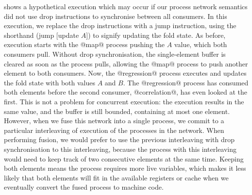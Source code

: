  shows a hypothetical execution which may occur if our process network semantics did not use drop instructions to synchronise between all consumers.
In this execution, we replace the drop instructions with a jump instruction, using the shorthand (jump [update $A$]) to signify updating the fold state.
As before, execution starts with the @map@ process pushing the $A$ value, which both consumers pull.
Without drop synchronisation, the single-element buffer is cleared as soon as the process pulls, allowing the @map@ process to push another element to both consumers.
Now, the @regression@ process executes and updates the fold state with both values $A$ and $B$.
The @regression@ process has consumed both elements before the second consumer, @correlation@, has even looked at the first.
This is not a problem for concurrent execution: the execution results in the same value, and the buffer is still bounded, containing at most one element.
However, when we fuse this network into a single process, we commit to a particular interleaving of execution of the processes in the network.
When performing fusion, we would prefer to use the previous interleaving with drop synchronisation to this interleaving, because the process with this interleaving would need to keep track of two consecutive elements at the same time.
Keeping both elements means the process requires more live variables, which makes it less likely that both elements will fit in the available registers or cache when we eventually convert the fused process to machine code.

% 
% 

